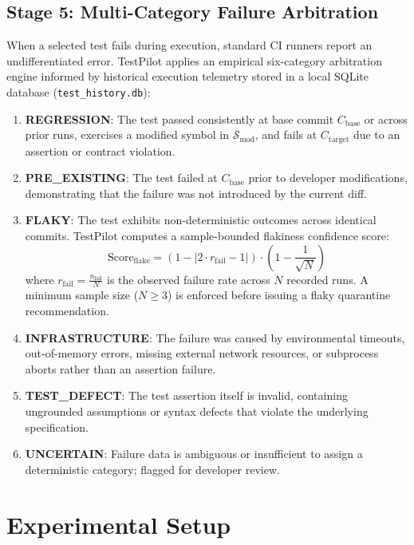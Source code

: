 \documentclass[12pt,onecolumn,draftclsnofoot]{IEEEtran}
\begin{document}
\subsection{Stage 5: Multi-Category Failure Arbitration}
When a selected test fails during execution, standard CI runners report an undifferentiated error. TestPilot applies an empirical six-category arbitration engine informed by historical execution telemetry stored in a local SQLite database (\texttt{test\_history.db}):
\begin{enumerate}
    \item \textbf{REGRESSION}: The test passed consistently at base commit $C_{\text{base}}$ or across prior runs, exercises a modified symbol in $\mathcal{S}_{\text{mod}}$, and fails at $C_{\text{target}}$ due to an assertion or contract violation.
    \item \textbf{PRE\_EXISTING}: The test failed at $C_{\text{base}}$ prior to developer modifications, demonstrating that the failure was not introduced by the current diff.
    \item \textbf{FLAKY}: The test exhibits non-deterministic outcomes across identical commits. TestPilot computes a sample-bounded flakiness confidence score:
    \begin{equation}
    \label{eq:flakiness}
    \text{Score}_{\text{flake}} = \left( 1 - |2 \cdot r_{\text{fail}} - 1| \right) \cdot \left( 1 - \frac{1}{\sqrt{N}} \right)
    \end{equation}
    where $r_{\text{fail}} = \frac{n_{\text{fail}}}{N}$ is the observed failure rate across $N$ recorded runs. A minimum sample size ($N \ge 3$) is enforced before issuing a flaky quarantine recommendation.
    \item \textbf{INFRASTRUCTURE}: The failure was caused by environmental timeouts, out-of-memory errors, missing external network resources, or subprocess aborts rather than an assertion failure.
    \item \textbf{TEST\_DEFECT}: The test assertion itself is invalid, containing ungrounded assumptions or syntax defects that violate the underlying specification.
    \item \textbf{UNCERTAIN}: Failure data is ambiguous or insufficient to assign a deterministic category; flagged for developer review.
\end{enumerate}

\section{Experimental Setup}
\label{sec:setup}
\end{document}
